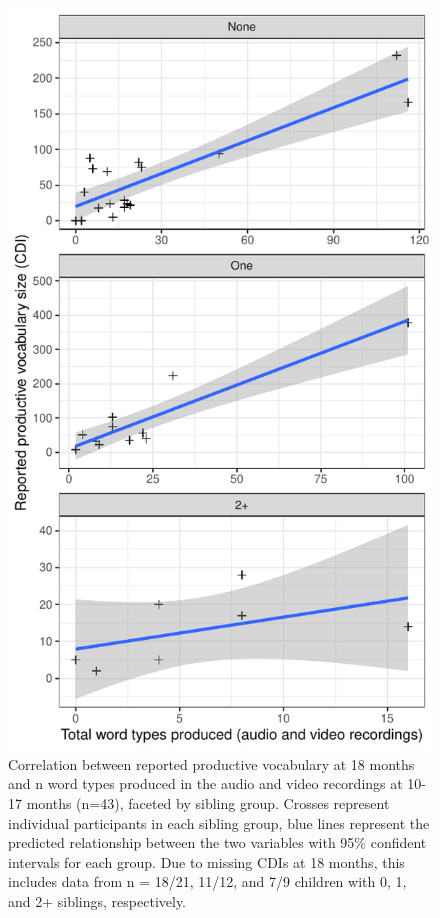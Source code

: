 \documentclass[
  man,mask,floatsintext]{apa6}
\begin{document}
\begin{figure}
\centering
\includegraphics{SiblingsStudy_SupplementaryData-anon-revisions_files/figure-latex/Figure-cdi-types-1.pdf}
\caption{\label{fig:Figure-cdi-types}Correlation between reported productive vocabulary at 18 months and n word types produced in the audio and video recordings at 10-17 months (n=43), faceted by sibling group. Crosses represent individual participants in each sibling group, blue lines represent the predicted relationship between the two variables with 95\% confident intervals for each group. Due to missing CDIs at 18 months, this includes data from n = 18/21, 11/12, and 7/9 children with 0, 1, and 2+ siblings, respectively.}
\end{figure}
\end{document}
